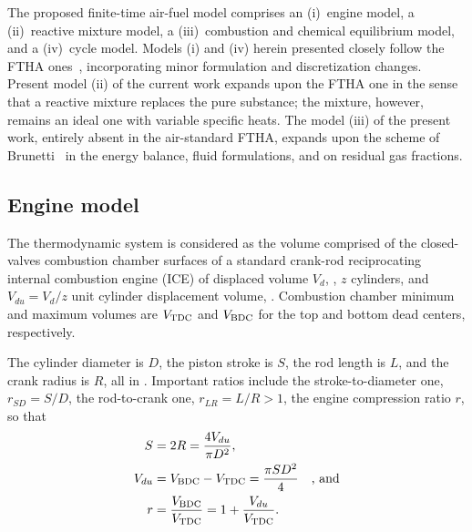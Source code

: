     The proposed finite-time air-fuel model comprises an (i)~engine model, a (ii)~reactive mixture model, a (iii)~combustion and
    chemical equilibrium model, and a  (iv)~cycle  model.  Models  (i)  and  (iv)  herein  presented  closely  follow  the  FTHA
    ones~\cite{2017-NaaktgeborenC-IntJMechEngEduc}, incorporating minor formulation and discretization  changes.  Present  model
    (ii) of the current work expands upon the FTHA one in the sense that a reactive mixture replaces  the  pure  substance;  the
    mixture, however, remains an ideal one with variable specific heats. The model (iii) of the present work, entirely absent in
    the air-standard FTHA, expands upon the scheme  of  Brunetti~\cite{2012-BrunettiF-Blucher}  in  the  energy  balance,  fluid
    formulations, and on residual gas fractions.


    \subsection{Engine model}\label{sec:model.engine}

    The thermodynamic system is considered as the volume comprised  of  the  closed-valves  combustion  chamber  surfaces  of  a
    standard crank-rod reciprocating internal combustion engine (ICE) of displaced volume $V_d$,  \meter\cubed,  $z$  cylinders,
    and $V_{du} = V_d / z$ unit cylinder displacement volume, \meter\cubed. Combustion chamber minimum and maximum  volumes  are
    $V_{\mbox{\scriptsize TDC}}$ and $V_{\mbox{\scriptsize BDC}}$ for the top and bottom dead centers, respectively.

    The cylinder diameter is $D$, the piston stroke is $S$, the rod length is $L$, and the crank radius is $R$, all  in  \meter.
    Important ratios include the stroke-to-diameter one, $r_{SD} = S/D$, the rod-to-crank one, $r_{LR} = L/R >  1$,  the  engine
    compression ratio $r$, so that%
    \begin{align}
        \label{eq:S}
        S       &= 2 R = \frac{4 V_{du}}{\pi D^{2}}, \\
        \label{eq:Vdu}
        V_{du}  &= V_{\mbox{\scriptsize BDC}} - V_{\mbox{\scriptsize TDC}} = \frac{\pi SD^2}{4}\quad\mbox{, and} \\
        \label{eq:r}
        r       &= \frac{V_{\mbox{\scriptsize BDC}}}{V_{\mbox{\scriptsize TDC}}} = 1 + \frac{V_{du}}{V_{\mbox{\scriptsize TDC}}}.
    \end{align}




